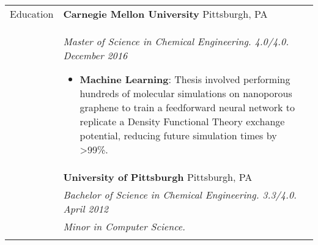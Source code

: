 \documentclass[11pt]{article}
\begin{document}
\begin{tabular}[t]{@{}p{1.00in}@{} @{}p{6.00in}@{}}

{Education}
&
\textbf{Carnegie Mellon University} \hfill Pittsburgh, PA \\ &
\textit{Master of Science in Chemical Engineering. 4.0/4.0. \hfill December 2016}
\begin{itemize}
    \item \textbf{Machine Learning}: Thesis involved performing hundreds of molecular simulations on nanoporous graphene to train a feedforward neural network to replicate a Density Functional Theory exchange potential, reducing future simulation times by >99\%.
\end{itemize}
\\
&
\textbf{University of Pittsburgh} \hfill Pittsburgh, PA \\ &
\textit{Bachelor of Science in Chemical Engineering. 3.3/4.0. \hfill April 2012}
\\ &\textit{Minor in Computer Science.}%
\\
\\


\end{tabular}
\end{document}
